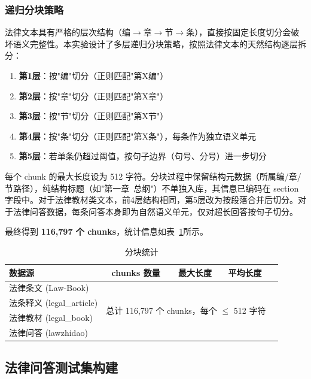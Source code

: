 \documentclass[12pt, a4paper]{article}
\begin{document}
\subsubsection{递归分块策略}

法律文本具有严格的层次结构（编$\rightarrow$章$\rightarrow$节$\rightarrow$条），直接按固定长度切分会破坏语义完整性。本实验设计了多层递归分块策略，按照法律文本的天然结构逐层拆分：

\begin{enumerate}[leftmargin=2em]
    \item \textbf{第1层}：按"编"切分（正则匹配"第X编"）
    \item \textbf{第2层}：按"章"切分（正则匹配"第X章"）
    \item \textbf{第3层}：按"节"切分（正则匹配"第X节"）
    \item \textbf{第4层}：按"条"切分（正则匹配"第X条"），每条作为独立语义单元
    \item \textbf{第5层}：若单条仍超过阈值，按句子边界（句号、分号）进一步切分
\end{enumerate}

每个 chunk 的最大长度设为 512 字符。分块过程中保留结构元数据（所属编/章/节路径），纯结构标题（如"第一章\ 总纲"）不单独入库，其信息已编码在 section 字段中。对于法律教材类文本，前4层结构相同，第5层改为按段落合并后切分。对于法律问答数据，每条问答本身即为自然语义单元，仅对超长回答按句子切分。

最终得到 \textbf{116,797 个 chunks}，统计信息如表~\ref{tab:chunk_stats}所示。

\begin{table}[H]
\centering
\caption{分块统计}
\label{tab:chunk_stats}
\begin{tabular}{lcccc}
\toprule
\textbf{数据源} & \textbf{chunks 数量} & \textbf{最大长度} & \textbf{平均长度} \\
\midrule
法律条文 (Law-Book)     & \multicolumn{3}{c}{\multirow{4}{*}{总计 116,797 个 chunks，每个 $\leq$ 512 字符}} \\
法条释义 (legal\_article) & & & \\
法律教材 (legal\_book)    & & & \\
法律问答 (lawzhidao)      & & & \\
\bottomrule
\end{tabular}
\end{table}

\subsection{法律问答测试集构建}
\end{document}
